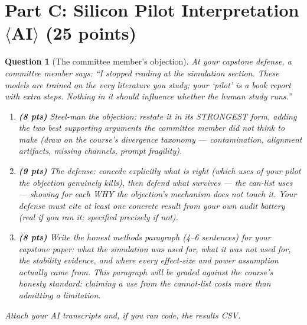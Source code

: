 \documentclass[11pt]{article}
\newtheorem{question}{Question}
\begin{document}
\section*{Part C: Silicon Pilot Interpretation $\langle$AI$\rangle$
(25 points)}

\begin{question}[The committee member's objection]
At your capstone defense, a committee member says: ``I stopped reading
at the simulation section. These models are trained on the very
literature you study; your `pilot' is a book report with extra steps.
Nothing in it should influence whether the human study runs.''

\begin{enumerate}[label=(\alph*)]
  \item \textbf{(8 pts)} Steel-man the objection: restate it in its
        STRONGEST form, adding the two best supporting arguments the
        committee member did not think to make (draw on the course's
        divergence taxonomy --- contamination, alignment artifacts,
        missing channels, prompt fragility).
  \item \textbf{(9 pts)} The defense: concede explicitly what is
        right (which uses of your pilot the objection genuinely
        kills), then defend what survives --- the can-list uses ---
        showing for each WHY the objection's mechanism does not touch
        it. Your defense must cite at least one concrete result from
        your own audit battery (real if you ran it; specified
        precisely if not).
  \item \textbf{(8 pts)} Write the honest methods paragraph
        (4--6 sentences) for your capstone paper: what the simulation
        was used for, what it was not used for, the stability
        evidence, and where every effect-size and power assumption
        actually came from. This paragraph will be graded against the
        course's honesty standard: claiming a use from the
        cannot-list costs more than admitting a limitation.
\end{enumerate}
Attach your AI transcripts and, if you ran code, the results CSV.
\end{question}
\end{document}
